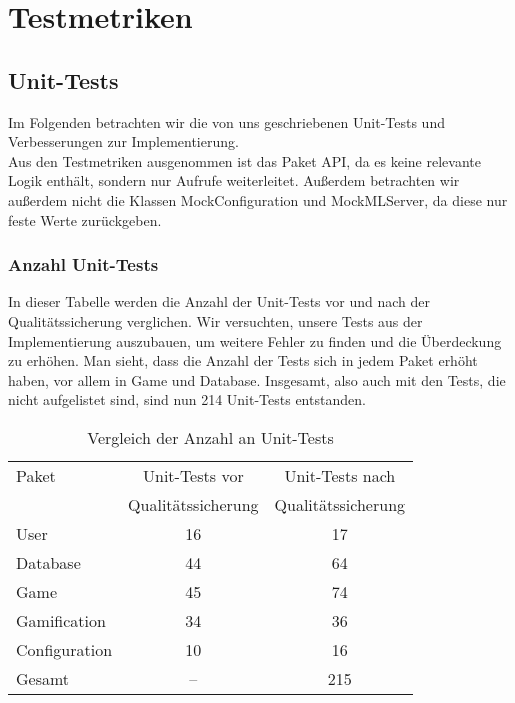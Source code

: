 \documentclass[a4paper]{scrreprt}
\begin{document}
    \chapter{Testmetriken}
    \section{Unit-Tests}
    Im Folgenden betrachten wir die von uns geschriebenen Unit-Tests und Verbesserungen zur Implementierung. \\
    Aus den Testmetriken ausgenommen ist das Paket API, da es keine relevante Logik enthält, sondern nur Aufrufe weiterleitet.
    Außerdem betrachten wir außerdem nicht die Klassen MockConfiguration und MockMLServer, da diese nur feste Werte zurückgeben.

    \subsection{Anzahl Unit-Tests}
    In dieser Tabelle werden die Anzahl der Unit-Tests vor und nach der Qualitätssicherung verglichen. Wir versuchten, unsere Tests aus der Implementierung
    auszubauen, um weitere Fehler zu finden und die Überdeckung zu erhöhen. Man sieht, dass die Anzahl der Tests sich in jedem Paket erhöht haben, vor allem in Game
    und Database. Insgesamt, also auch mit den Tests, die nicht aufgelistet sind, sind nun 214 Unit-Tests entstanden.

    \vspace{20pt}
    \begin{table}[h]
        \begin{center}
        \begin{tabular}{ | l | c | c | }
            \hline
            Paket & Unit-Tests vor & Unit-Tests nach  \\
            & Qualitätssicherung & Qualitätssicherung \\ \hline
            User & 16 & 17 \\
            Database & 44 & 64 \\
            Game & 45 & 74 \\
            Gamification & 34 & 36 \\
            Configuration & 10 & 16 \\
            Gesamt & -- & 215  \\
            \hline
        \end{tabular}
        \end{center}
        \caption{Vergleich der Anzahl an Unit-Tests}
    \end{table}%
\end{document}
